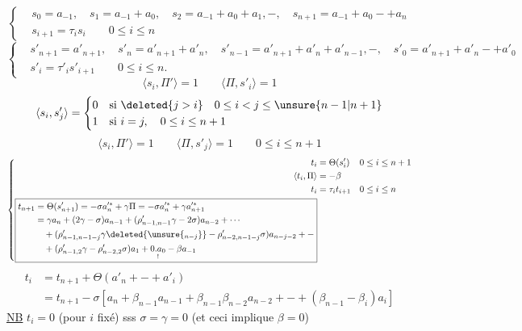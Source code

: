 \[
\left\{\begin{aligned}
&s_0=a_{-1},\quad s_1=a_{-1}+a_0,\quad
s_2=a_{-1}+a_0+a_1,\mathbin{-},\quad
s_{n+1}=a_{-1}+a_0\mathbin{-}+a_n\\
&s_{i+1}=\tau_i s_i\qquad0\leq i\leq n
\end{aligned}\right.
\]
\[
\left\{\begin{aligned}
&s'_{n+1}=a'_{n+1},\quad s'_n=a'_{n+1}+a'_n,\quad
s'_{n-1}=a'_{n+1}+a'_n+a'_{n-1},\mathbin{-},\quad
s'_0=a'_{n+1}+a'_n\mathbin{-}+a'_0\\
&s'_i=\tau'_i s'_{i+1}\qquad0\leq i\leq n.
\end{aligned}\right.
\]
\[
\langle s_i,\Pi'\rangle=1\qquad\langle\Pi,s'_i\rangle=1
\]
\[
\langle s_i,s'_j\rangle=
\begin{cases}
0&\text{si }\deleted{j>i}\quad0\leq i<j\leq\unsure{n-1|n+1}\\
1&\text{si }i=j,\quad0\leq i\leq n+1
\end{cases}
\]
\[
\langle s_i,\Pi'\rangle=1\qquad
\langle\Pi,s'_j\rangle=1\qquad0\leq i\leq n+1
\]
\[
\left\{\begin{aligned}
t_i&=\Theta(s'_i)&&0\leq i\leq n+1\\
\langle t_i,\Pi\rangle&=-\beta\\
t_i&=\tau_i t_{i+1}&&0\leq i\leq n\\
\boxed{\begin{aligned}
t_{n+1}&=\Theta(s'_{n+1})=-\sigma a_n'^*+\gamma\Pi
=-\sigma a_n'^*+\gamma a_{n+1}'^*\\
&=\gamma a_n+(2\gamma-\sigma)a_{n-1}
+(\rho'_{n-1,n-1}\gamma-2\sigma)a_{n-2}+\cdots\\
&\quad+(\rho'_{n-1,n-1-j}\gamma
\deleted{\unsure{{}_{n-j}}}
-\rho'_{n-2,n-1-j}\sigma)a_{n-j-2}+\mathbin{-}\\
&\quad+(\rho'_{n-1,2}\gamma-\rho'_{n-2,2}\sigma)a_1
+\underset{!}{0.a_0}-\beta a_{-1}
\end{aligned}}
\end{aligned}\right.
\]
\[
\begin{aligned}
t_i&=t_{n+1}+\Theta(a'_n+\mathbin{-}+a'_i)\\
&=t_{n+1}-\sigma[a_n+\beta_{n-1}a_{n-1}
+\beta_{n-1}\beta_{n-2}a_{n-2}+\mathbin{-}
+(\beta_{n-1}\mathbin{-}\beta_i)a_i]
\end{aligned}
\]
\margin{\[
\Theta(a'_j)=-\sigma(\beta_{n-1}\mathbin{-}\beta_j)a_j
\qquad0\leq j\leq n
\]}
\uline{NB} \(t_i=0\) (pour \(i\) fixé) sss \(\sigma=\gamma=0\)
(et ceci implique \(\beta=0\))

